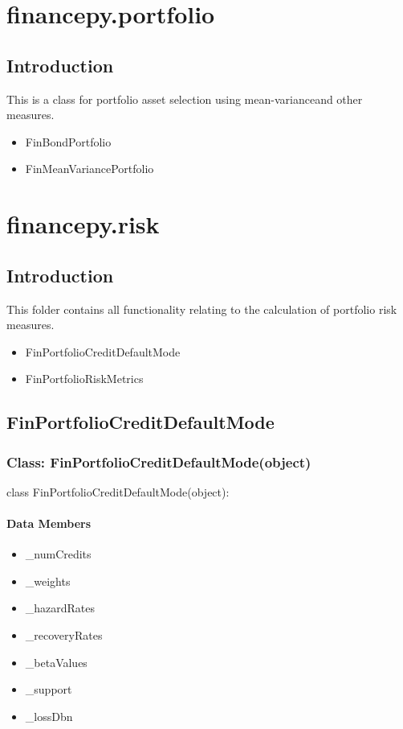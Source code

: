 \documentclass[twoside,11pt]{book}
\begin{document}
\chapter{financepy.portfolio}
\section{Introduction}

This is a class for portfolio asset selection using mean-varianceand other measures.

\begin{itemize}
\item{ FinBondPortfolio
}
\item{ FinMeanVariancePortfolio
}
\end{itemize}

\chapter{financepy.risk}
\section{Introduction}

This folder contains all functionality relating to the calculation of portfolio risk measures.
\begin{itemize}
\item{ FinPortfolioCreditDefaultMode
}
\item{ FinPortfolioRiskMetrics
}
\end{itemize}
\newpage
\section{FinPortfolioCreditDefaultMode}

\subsection*{Class: FinPortfolioCreditDefaultMode(object)}
class FinPortfolioCreditDefaultMode(object): 

\subsubsection*{Data Members}
\begin{itemize}
\item{\_numCredits}
\item{\_weights}
\item{\_hazardRates}
\item{\_recoveryRates}
\item{\_betaValues}
\item{\_support}
\item{\_lossDbn}
\end{itemize}
\end{document}
